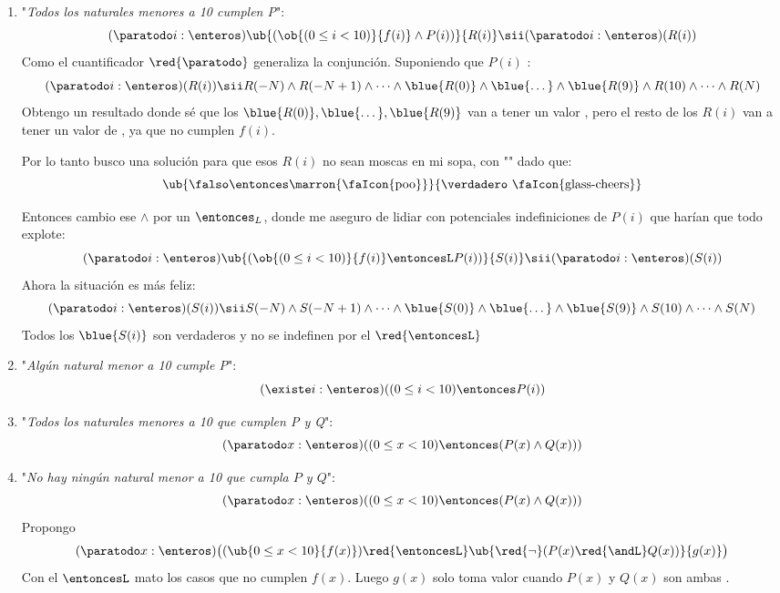 \begin{enumerate}[label=\alph*)]
  \item "\textit{Todos los naturales menores a 10 cumplen P}":
        $$
          (\paratodo i : \enteros)\ub{(\ob{(0 \leq i < 10)}{f(i)} \land P(i))}{R(i)} \sii (\paratodo i : \enteros)(R(i))
        $$
        Como el cuantificador $\red{\paratodo}$ generaliza la conjunción. Suponiendo que $P(i)$ :
        $$
          (\paratodo i : \enteros)(R(i))
          \sii
          R(-N) \land R(-N+1)
          \land \dots \land
          \blue{R(0)}
          \land \blue{\dots} \land
          \blue{R(9)} \land
          R(10)
          \land \dots \land
          R(N)
        $$
        Obtengo un resultado donde sé que los $\blue{R(0)},\blue{\dots}, \blue{R(9)}$ van a tener un valor \verdadero, pero el resto de los $R(i)$ van a tener
        un valor de \falso, ya que no cumplen $f(i)$.\par
        Por lo tanto busco una solución para que esos $R(i)$ no sean moscas en mi sopa, con "\red{$\entonces$}" dado que:
        $$
          \ub{\falso \entonces \text{\marron{\faIcon{poo}}}}{\verdadero \text{ \faIcon{glass-cheers}}}
        $$

        Entonces cambio ese $\land$ por un $\entonces_L$, donde me aseguro de lidiar con potenciales
        indefiniciones de $P(i)$ que harían que todo explote:
        $$
          (\paratodo i : \enteros)\ub{(\ob{(0 \leq i < 10)}{f(i)} \entoncesL P(i))}{S(i)} \sii (\paratodo i : \enteros)(S(i))
        $$
        Ahora la situación es más feliz:
        $$
          (\paratodo i : \enteros)(S(i))
          \sii
          S(-N) \land S(-N+1)
          \land \dots \land
          \blue{S(0)}
          \land \blue{\dots} \land
          \blue{S(9)} \land
          S(10)
          \land \dots \land
          S(N)
        $$
        Todos los $\blue{S(i)}$ son verdaderos y no se indefinen por el $\red{\entoncesL}$

  \item "\textit{Algún natural menor a 10 cumple P}":
        $$
          (\existe i : \enteros)((0 \leq i < 10) \entonces P(i))
        $$

  \item "\textit{Todos los naturales menores a 10 que cumplen P y Q}":
        $$
          (\paratodo x : \enteros)((0 \leq x < 10) \entonces (P(x) \land Q(x)))
        $$

  \item "\textit{No hay ningún natural menor a 10 que cumpla $P$ y $Q$}":
        $$
          (\paratodo x : \enteros)((0 \leq x < 10) \entonces (P(x) \land Q(x)))
        $$
        Propongo
        $$
          (\paratodo x : \enteros)\bigl((\ub{0 \leq x < 10}{f(x)}) \red{\entoncesL} \ub{
          \red{\neg}(P(x) \red{\andL} Q(x))} {g(x)}\bigr)
        $$
        Con el $\entoncesL$ mato los casos que no cumplen $f(x)$. Luego $g(x)$ solo toma valor \falso cuando $P(x)$ y $Q(x)$ son ambas \verdadero.
\end{enumerate}
